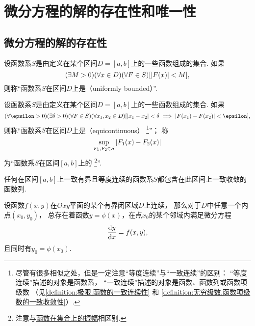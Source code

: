 \section{微分方程的解的存在性和唯一性}
\subsection{微分方程的解的存在性}
\begin{definition}\label{definition:微分方程.函数系的一致有界性}
设函数系\(S\)是由定义在某个区间\(D = [a,b]\)上的一些函数组成的集合.
如果\begin{equation*}
	(\exists M>0)
	(\forall x \in D)
	(\forall F \in S)
	[\abs{F(x)} < M],
\end{equation*}
则称“函数系\(S\)在区间\(D\)上是（uniformly bounded）”.
\end{definition}

\begin{definition}\label{definition:微分方程.函数系的等度连续性}
设函数系\(S\)是由定义在某个区间\(D = [a,b]\)上的一些函数组成的集合.
如果\begin{equation*}
	(\forall\epsilon>0)
	(\exists\delta>0)
	(\forall F \in S)
	(\forall x_1,x_2 \in D)
	[\abs{x_1-x_2} < \delta \implies \abs{F(x_1)-F(x_2)} < \epsilon],
\end{equation*}
则称“函数系\(S\)在区间\(D\)上是（equicontinuous）%
\footnote{尽管有很多相似之处，但是一定注意“等度连续”与“一致连续”的区别：
“等度连续”描述的对象是函数系，
“一致连续”描述的对象是函数、函数列或函数项级数
（见\cref{definition:极限.函数的一致连续性} 和
\cref{definition:无穷级数.函数项级数的一致收敛性}）.}”；
称\begin{equation*}
	\sup_{F_1,F_2 \in S} \abs{F_1(x)-F_2(x)}
\end{equation*}为“函数系\(S\)在区间\([a,b]\)上的%
\footnote{注意与\hyperref[definition:极限.函数在集合上的振幅]{函数在集合上的振幅}相区别.}”.
\end{definition}

\begin{lemma}\label{theorem:微分方程概论.阿斯科拉--阿尔泽拉引理}
任何在区间\([a,b]\)上一致有界且等度连续的函数系\(S\)都包含在此区间上一致收敛的函数列.
\end{lemma}

\begin{theorem}
设函数\(f(x,y)\)在\(Oxy\)平面的某个有界闭区域\(D\)上连续，
那么对于\(D\)中任意一个内点\((x_0,y_0)\)，
总存在着函数\(y = \phi(x)\)，在点\(x_0\)的某个邻域内满足微分方程\begin{equation*}
	\dv{y}{x} = f(x,y),
\end{equation*}且同时有\(y_0 = \phi(x_0)\).
\end{theorem}

